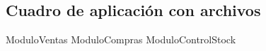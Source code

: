 \subsection{Cuadro de aplicación con archivos}

\begin{cuadroAplicacionArchivos}
  \cuadroAplicacionArchivosItem
    {ModuloVentas}
    {}
	{}
  \cuadroAplicacionArchivosItem
    {ModuloCompras}
    {}
	{}
  \cuadroAplicacionArchivosItem
    {ModuloControlStock}
    {}
	{}
\end{cuadroAplicacionArchivos}

